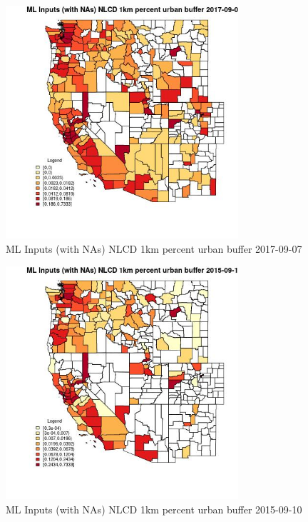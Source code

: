 \begin{figure} 
\centering  
\includegraphics[width=0.77\textwidth]{Code_Outputs/Report_ML_input_PM25_Step4_part_e_de_duplicated_aves_compiled_2019-05-21wNAs_CountyNLCD_1km_percent_urban_bufferMean2017-09-07.jpg} 
\caption{\label{fig:Report_ML_input_PM25_Step4_part_e_de_duplicated_aves_compiled_2019-05-21wNAsCountyNLCD_1km_percent_urban_bufferMean2017-09-07}ML Inputs (with NAs) NLCD 1km percent urban buffer 2017-09-07} 
\end{figure} 
 

\begin{figure} 
\centering  
\includegraphics[width=0.77\textwidth]{Code_Outputs/Report_ML_input_PM25_Step4_part_e_de_duplicated_aves_compiled_2019-05-21wNAs_CountyNLCD_1km_percent_urban_bufferMean2015-09-10.jpg} 
\caption{\label{fig:Report_ML_input_PM25_Step4_part_e_de_duplicated_aves_compiled_2019-05-21wNAsCountyNLCD_1km_percent_urban_bufferMean2015-09-10}ML Inputs (with NAs) NLCD 1km percent urban buffer 2015-09-10} 
\end{figure} 
 

